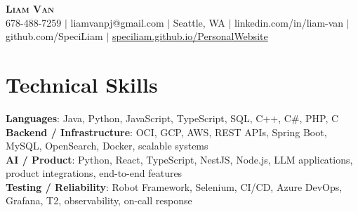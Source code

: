 \documentclass[letterpaper,11pt]{article}
\begin{document}

%
\begin{center}
    \textbf{\Huge \scshape Liam Van} \\ \vspace{1pt}
    \small 678-488-7259 $|$ \small {liamvanpj@gmail.com} $|$ Seattle, WA
 {{$|$ linkedin.com/in/liam-van} {$|$ github.com/SpeciLiam} {$|$ \href{https://speciliam.github.io/PersonalWebsite}{speciliam.github.io/PersonalWebsite}}}

\end{center}

\section{Technical Skills}
 \begin{itemize}[leftmargin=0.15in, label={}]
    \small{\item{
     \textbf{Languages}{: Java, Python, JavaScript, TypeScript, SQL, C++, C\#, PHP, C} \\
     \textbf{Backend / Infrastructure}{: OCI, GCP, AWS, REST APIs, Spring Boot, MySQL, OpenSearch, Docker, scalable systems} \\
     \textbf{AI / Product}{: Python, React, TypeScript, NestJS, Node.js, LLM applications, product integrations, end-to-end features} \\
     \textbf{Testing / Reliability}{: Robot Framework, Selenium, CI/CD, Azure DevOps, Grafana, T2, observability, on-call response} \\
    }}
 \end{itemize}
%
\end{document}
